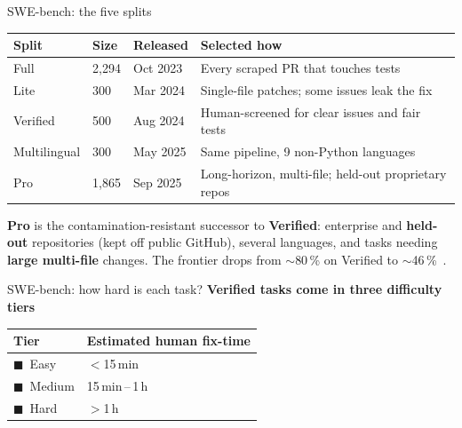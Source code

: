 \documentclass[
  aspectratio=169,
  font=times,
  sectionpage=true,
]{tumbeamer}
\begin{document}
\begin{frame}{SWE-bench: the five splits}
  \label{fr:splits}
  \begin{tabularx}{\textwidth}{@{}lll>{\raggedright\arraybackslash}X@{}}
    \toprule
    \textbf{Split} & \textbf{Size} & \textbf{Released} & \textbf{Selected how} \\
    \midrule
    Full & 2{,}294 & Oct 2023 & Every scraped PR that touches tests \\
    Lite & 300 & Mar 2024 & Single-file patches; some issues leak the
      fix~\cite{xia2024agentless} \\
    Verified & 500 & Aug 2024 & Human-screened for clear issues and fair
      tests~\cite{openai2024verified} \\
    Multilingual & 300 & May 2025 & Same pipeline, 9 non-Python
      languages~\cite{swebench2025multilingual} \\
    Pro & 1{,}865 & Sep 2025 & Long-horizon, multi-file; held-out proprietary
      repos~\cite{deng2025swebenchpro} \\
    \bottomrule
  \end{tabularx}

  \medskip
  {\small \textbf{Pro} is the contamination-resistant successor to
  \textbf{Verified}: enterprise and
  \textbf{held-out} repositories (kept off public GitHub), several languages, and
  tasks needing \textbf{large multi-file} changes. The frontier drops from
  $\sim$80\,\% on Verified to $\sim$46\,\%~\cite{deng2025swebenchpro}.}
\end{frame}

\begin{frame}{SWE-bench: how hard is each task?}
  \label{fr:difficulty}
  \textbf{Verified tasks come in three difficulty tiers}
  \medskip
  \begin{center}
    \small
    \begin{tabular}{@{}ll@{}}
      \toprule
      \textbf{Tier} & \textbf{Estimated human fix-time} \\
      \midrule
      \textcolor{TUMOrange}{$\blacksquare$}~Easy & $<$15\,min \\
      \textcolor{TUMGreen}{$\blacksquare$}~Medium & 15\,min\,--\,1\,h \\
      \textcolor{TUMExtRed}{$\blacksquare$}~Hard & $>$1\,h \\
      \bottomrule
    \end{tabular}
  \end{center}
\end{frame}
\end{document}
